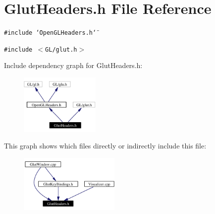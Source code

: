 \section{Glut\-Headers.h File Reference}
\label{GlutHeaders_8h}
{\tt \#include \char`\"{}Open\-GLHeaders.h\char`\"{}}\par
{\tt \#include $<$GL/glut.h$>$}\par


Include dependency graph for Glut\-Headers.h:\begin{figure}[H]
\begin{center}
\leavevmode
\includegraphics[width=109pt]{GlutHeaders_8h__incl}
\end{center}
\end{figure}


This graph shows which files directly or indirectly include this file:\begin{figure}[H]
\begin{center}
\leavevmode
\includegraphics[width=137pt]{GlutHeaders_8h__dep__incl}
\end{center}
\end{figure}
